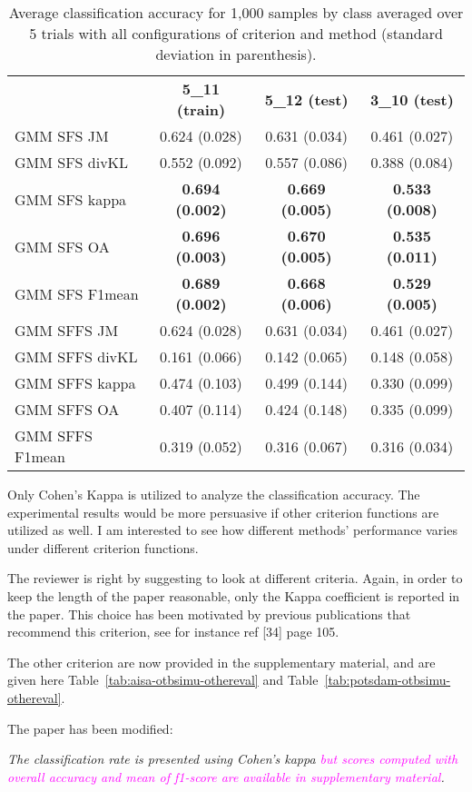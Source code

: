 \documentclass[a4paper,10pt,DIV=16]{scrartcl}
\newcommand{\rev}[1]{\textcolor{magenta}{#1}}
\begin{document}
    \begin{table}[!t]
        \centering
        \caption{Average classification accuracy for 1,000 samples by class averaged over 5 trials  with all configurations of criterion and method (standard deviation in parenthesis).\label{tab:potsdam-otbsimu-all}}
        \begin{tabular}{lccc}\toprule
            & {\bfseries 5\_11 (train)} & {\bfseries 5\_12 (test)} & {\bfseries 3\_10 (test)} \\ \cmidrule{2-4}
            GMM SFS JM &      0.624 (0.028) & 0.631 (0.034) & 0.461 (0.027) \\
            GMM SFS divKL &   0.552 (0.092) & 0.557 (0.086) & 0.388 (0.084) \\
            GMM SFS kappa &   {\bfseries 0.694 (0.002)} & {\bfseries 0.669 (0.005)} & {\bfseries 0.533 (0.008)} \\
            GMM SFS OA &      {\bfseries 0.696 (0.003)} & {\bfseries 0.670 (0.005)} & {\bfseries 0.535 (0.011)} \\
            GMM SFS F1mean &  {\bfseries 0.689 (0.002)} & {\bfseries 0.668 (0.006)} & {\bfseries 0.529 (0.005)} \\
            GMM SFFS JM &     0.624 (0.028) & 0.631 (0.034) & 0.461 (0.027) \\
            GMM SFFS divKL &  0.161 (0.066) & 0.142 (0.065) & 0.148 (0.058) \\
            GMM SFFS kappa &  0.474 (0.103) & 0.499 (0.144) & 0.330 (0.099) \\
            GMM SFFS OA &     0.407 (0.114) & 0.424 (0.148) & 0.335 (0.099) \\
            GMM SFFS F1mean & 0.319 (0.052) & 0.316 (0.067) & 0.316 (0.034) \\
            \bottomrule
        \end{tabular}
    \end{table}

\begin{revbox}
  Only Cohen’s Kappa is utilized to analyze the classification accuracy. The experimental results would be more persuasive if other criterion functions are utilized as well. I am interested to see how different methods’ performance varies under different criterion functions.
  \begin{resbox}
    The reviewer is right by suggesting to look at different criteria. Again, in order to keep the length of the paper reasonable, only the Kappa coefficient is reported in the paper. This choice has been motivated by previous publications that recommend this criterion, see for instance ref [34] page 105.

    The other criterion are now provided in the supplementary material, and are given here Table~\ref{tab:aisa-otbsimu-othereval} and  Table~\ref{tab:potsdam-otbsimu-othereval}.

    The paper has been modified:

    \emph{The    classification   rate    is    presented   using    Cohen's kappa \rev{but scores computed with overall accuracy and mean of f1-score are available in supplementary material}.}
  \end{resbox}
\end{revbox}
\end{document}

